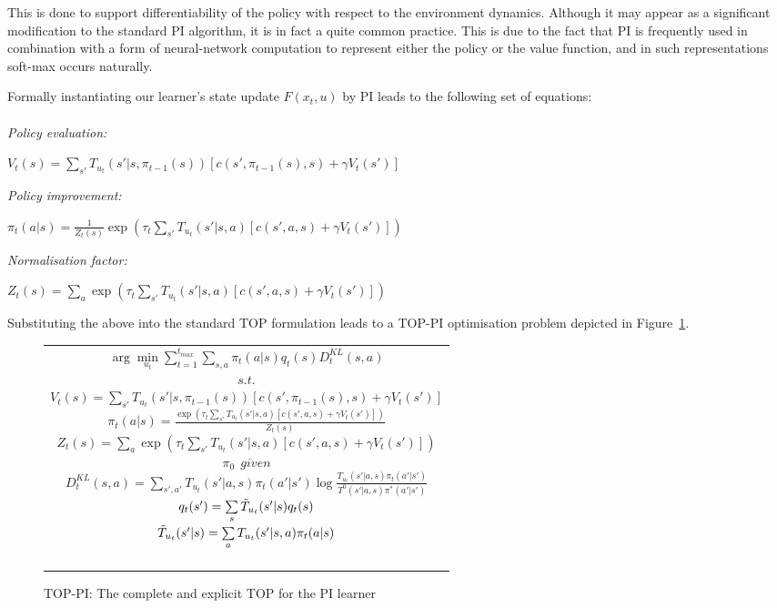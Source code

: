 This is done to support differentiability of the policy with respect
to the environment dynamics. Although it may appear as a significant
modification to the standard PI algorithm, it is in fact a quite
common practice. This is due to the fact that PI is frequently used in
combination with a form of neural-network computation to represent
either the policy or the value function, and in such representations
soft-max occurs naturally.

Formally instantiating our learner's state update $F(x_t,u)$ by PI
leads to the following set of equations:\\\ \\
{\em Policy evaluation:}\\
\centerline{
  $V_t(s)=\sum\limits_{s'}T_{u_t}(s'|s,\pi_{t-1}(s))\left[
    c(s',\pi_{t-1}(s),s)+\gamma V_t(s')
    \right]$}
{\em Policy improvement:}\\
\centerline{
$\pi_t(a|s)=\frac{1}{Z_t(s)}\exp\left(\tau_t\sum\limits_{s'}T_{u_t}(s'|s,a)\left[
    c(s',a,s)+\gamma V_t(s')
    \right]\right)$}
{\em Normalisation factor:}\\ 
\centerline{
$Z_t(s)=\sum\limits_a\exp\left(\tau_t\sum\limits_{s'}T_{u_t}(s'|s,a)\left[
    c(s',a,s)+\gamma V_t(s') \right]\right)$}

Substituting the above into the standard
TOP formulation leads to a TOP-PI optimisation problem depicted in
Figure~\ref{t_opt_PI}.
\begin{figure}[th]
\begin{tabular}{|c|} \hline \parbox{3.2 in} {\center 
$\arg\min\limits_{u_t}\sum\limits_{t=1}^{t_{max}}\sum\limits_{s,a}\pi_t(a|s)q_t(s)D^{KL}_t(s,a)$\\
$s.t.$\\
$V_t(s)=\sum\limits_{s'}T_{u_t}(s'|s,\pi_{t-1}(s))\left[
c(s',\pi_{t-1}(s),s)+\gamma V_t(s')
\right]$\\
$\pi_t(a|s)=\frac{\exp\left(\tau_t\sum\limits_{s'}T_{u_t}(s'|s,a)\left[
c(s',a,s)+\gamma V_t(s')
\right]\right)}{Z_t(s)}$\\
$Z_t(s)=\sum\limits_a\exp\left(\tau_t\sum\limits_{s'}T_{u_t}(s'|s,a)\left[
c(s',a,s)+\gamma V_t(s')
\right]\right)$\\
$\pi_0\ \ \displaystyle{given}$\\
$D^{KL}_t(s,a)=\sum\limits_{s',a'}T_{u_t}(s'|a,s)\pi_t(a'|s')\log\frac{T_{u_t}(s'|a,s)\pi_t(a'|s')}{T^0(s'|a,s)\pi^*(a'|s')}$\\
$q_t(s')=\sum\limits_s\Tilde{T}_{u_t}(s'|s)q_t(s)$\\
$\Tilde{T}_{u_t}(s'|s)=\sum\limits_aT_{u_t}(s'|s,a)\pi_t(a|s)$\\\ \\
}\\ \hline \end{tabular}
\caption{\label{t_opt_PI}TOP-PI: The complete and explicit TOP for the
  PI learner}
\end{figure}
